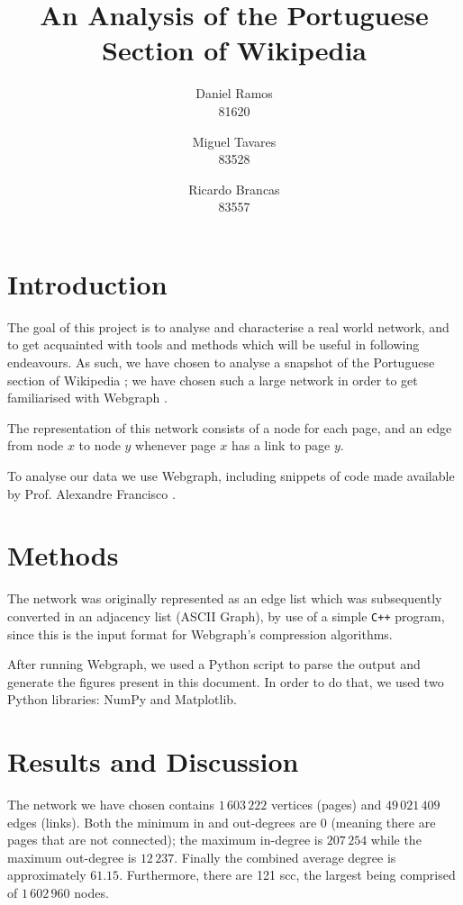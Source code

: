 \documentclass[9pt,a4paper,twocolumn]{article}
\title{An Analysis of the Portuguese Section of Wikipedia}
\author{Daniel Ramos \\ 81620 \and Miguel Tavares \\ 83528 \and Ricardo Brancas  \\ 83557}
\begin{document}
\maketitle

\section{Introduction}
The goal of this project is to analyse and characterise a real world network, and to  get acquainted with tools and methods which will be useful in following endeavours.
As such, we have chosen to analyse a snapshot of the Portuguese section of Wikipedia \cite{dataset};
we have chosen such a large network in order to get familiarised with Webgraph \cite{webgraph}.

The representation of this network consists of a node for each page, and an edge from node $x$ to node $y$ whenever page $x$ has a link to page $y$.

To analyse our data we use Webgraph, including snippets of code made available
by Prof. Alexandre Francisco \cite{aplf}.

\section{Methods}
The network was originally represented as an edge list which was subsequently converted in an adjacency list (ASCII Graph), by use of a simple \texttt{C++} program, since this is the input
format for Webgraph's compression algorithms.

After running Webgraph, we used a Python script to parse the output and generate the figures present in this document.
In order to do that, we used two Python libraries: NumPy and Matplotlib.

\section{Results and Discussion}

The network we have chosen contains $1\,603\,222$ vertices (pages) and $49\,021\,409$ edges (links). Both the minimum in and out-degrees are $0$ (meaning there are pages that are not connected); the maximum in-degree is $207\,254$ while the maximum out-degree is $12\,237$. Finally the combined average degree is approximately $61.15$. Furthermore, there are 121 \acrlong{scc}, the largest being comprised of $1\,602\,960$ nodes.
\vspace{1\baselineskip}
\end{document}
